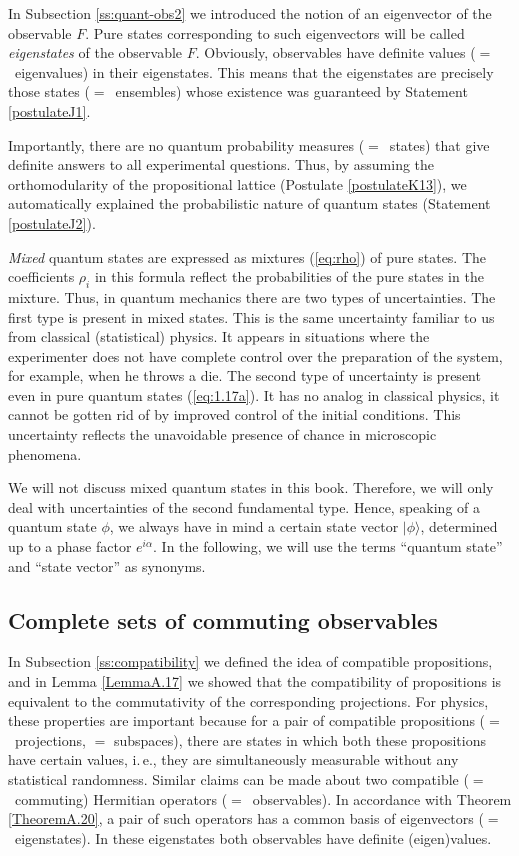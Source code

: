 \documentclass[nochecklpage]{stefan1}
\theoremstyle{definition}
\begin{document}
In Subsection \ref{ss:quant-obs2} we introduced the notion of an
eigenvector of the observable $F$. Pure states corresponding to such
eigenvectors will be called \emph{eigenstates} of the observable $ F
$. Obviously, observables have
definite values ($=$~eigenvalues) in their eigenstates. This means that
the eigenstates are precisely those states ($=$~ensembles) whose existence
was guaranteed by Statement \ref{postulateJ1}.

Importantly, there are no quantum probability measures ($=$~states) that
give definite answers to all experimental questions. Thus, by assuming
the orthomodularity of the propositional lattice (Postulate
\ref{postulateK13}), we automatically explained the probabilistic nature
of quantum states (Statement \ref{postulateJ2}).

\emph{Mixed} quantum states are expressed as mixtures (\ref{eq:rho}) of
pure states. The coefficients $ \rho_{i} $ in this
formula reflect the probabilities of the pure states in the mixture.
Thus, in quantum mechanics there are two types of uncertainties. The
first type is present in mixed states. This is the same uncertainty
familiar to us from classical (statistical) physics. It appears in
situations where the experimenter does not have complete control over
the preparation of the system, for example, when he throws a die. The
second type of uncertainty is present even in pure quantum states
(\ref{eq:1.17a}). It has no analog in classical physics, it cannot be
gotten rid of by improved control of the initial conditions. This
uncertainty reflects the unavoidable presence of chance in microscopic
phenomena.

We will not discuss mixed quantum states in this book. Therefore, we
will only deal with uncertainties of the second fundamental type. Hence,
speaking of a quantum state $ \phi $, we always have in mind a certain
state vector $ | \phi \rangle $, determined up to a phase factor
$ e^{i \alpha } $. In the following, we will use the terms ``quantum
state'' and ``state vector'' as synonyms.

\subsection{Complete sets of commuting observables}\label{ss:compatible}
In Subsection \ref{ss:compatibility} we defined the idea of compatible
propositions, and in Lemma \ref{LemmaA.17} we showed that the
compatibility of propositions is equivalent to the commutativity of the
corresponding projections. For physics, these properties are important
because for a pair of compatible propositions ($=$~projections, $=$
subspaces), there are states in which both these propositions have
certain values, i.\,e., they are simultaneously measurable without any
statistical randomness. Similar claims can be made about two compatible
($=$~commuting) Hermitian operators ($=$~observables). In accordance with
Theorem \ref{TheoremA.20}, a pair of such operators has a common basis
of eigenvectors ($=$~eigenstates). In these eigenstates both observables
have definite (eigen)values.
\end{document}
